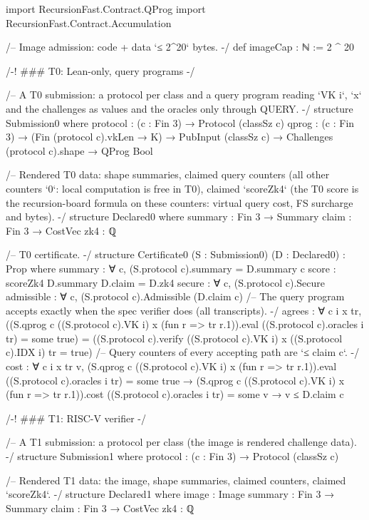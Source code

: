 \begin{leancode}[fontsize=\scriptsize,label={\footnotesize Contract/Certificate.lean}]
import RecursionFast.Contract.QProg
import RecursionFast.Contract.Accumulation

/-- Image admission: code + data `≤ 2^20` bytes. -/
def imageCap : ℕ := 2 ^ 20

/-! ### T0: Lean-only, query programs -/

/-- A T0 submission: a protocol per class and a query program reading `VK i`, `x` and the
challenges as values and the oracles only through QUERY. -/
structure Submission0 where
  protocol : (c : Fin 3) → Protocol (classSz c)
  qprog : (c : Fin 3) → (Fin (protocol c).vkLen → K) → PubInput (classSz c) →
    Challenges (protocol c).shape → QProg Bool

/-- Rendered T0 data: shape summaries, claimed query counters (all other counters `0`: local
computation is free in T0), claimed `scoreZk4` (the T0 score is the recursion-board formula on
these counters: virtual query cost, FS surcharge and bytes). -/
structure Declared0 where
  summary : Fin 3 → Summary
  claim : Fin 3 → CostVec
  zk4 : ℚ

/-- T0 certificate. -/
structure Certificate0 (S : Submission0) (D : Declared0) : Prop where
  summary : ∀ c, (S.protocol c).summary = D.summary c
  score : scoreZk4 D.summary D.claim = D.zk4
  secure : ∀ c, (S.protocol c).Secure
  admissible : ∀ c, (S.protocol c).Admissible (D.claim c)
  /-- The query program accepts exactly when the spec verifier does (all transcripts). -/
  agrees : ∀ c i x tr, ((S.qprog c ((S.protocol c).VK i) x (fun r => tr r.1)).eval
      ((S.protocol c).oracles i tr) = some true) = ((S.protocol c).verify ((S.protocol c).VK i) x ((S.protocol
          c).IDX i) tr = true)
  /-- Query counters of every accepting path are `≤ claim c`. -/
  cost : ∀ c i x tr v, (S.qprog c ((S.protocol c).VK i) x (fun r => tr r.1)).eval ((S.protocol c).oracles i tr)
      = some true →
      (S.qprog c ((S.protocol c).VK i) x (fun r => tr r.1)).cost ((S.protocol c).oracles i tr) {} = some v → v ≤
          D.claim c

/-! ### T1: RISC-V verifier -/

/-- A T1 submission: a protocol per class (the image is rendered challenge data). -/
structure Submission1 where
  protocol : (c : Fin 3) → Protocol (classSz c)

/-- Rendered T1 data: the image, shape summaries, claimed counters, claimed `scoreZk4`. -/
structure Declared1 where
  image : Image
  summary : Fin 3 → Summary
  claim : Fin 3 → CostVec
  zk4 : ℚ


\end{leancode}

